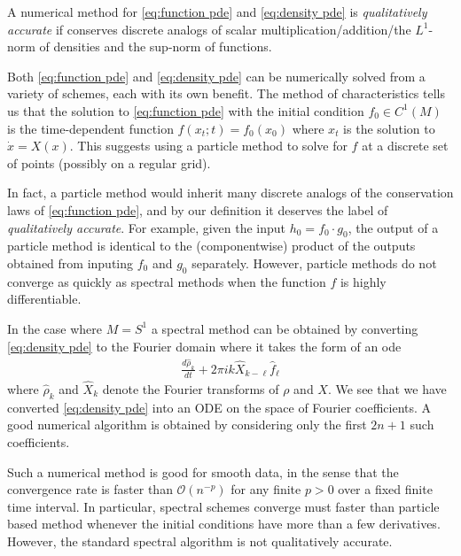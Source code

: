 \documentclass[final,leqno]{siamltex1213}
\begin{document}
\begin{definition}
	    A numerical method for \eqref{eq:function pde} and \eqref{eq:density pde} is \emph{qualitatively accurate} if conserves discrete analogs of scalar multiplication/addition/the $L^{1}$-norm of densities and the sup-norm of functions.
\end{definition}

Both \eqref{eq:function pde} and \eqref{eq:density pde} can be numerically solved from a variety of schemes, each with its own benefit.
The method of characteristics tells us that
the solution to \eqref{eq:function pde} with the initial condition $f_{0} \in C^{1}(M)$ is the time-dependent function $f( x_{t} ;t) = f_{0}( x_{0} )$ where $x_{t}$ is the solution to $\dot{x} = X(x)$.
This suggests using a particle method to solve for $f$ at a discrete set of points (possibly on a regular grid).
 
In fact, a particle method would inherit many discrete analogs of the conservation laws of \eqref{eq:function pde},
and by our definition it deserves the label of \emph{qualitatively accurate}.
For example, given the input $h_{0} = f_{0} \cdot g_{0}$, the output of a particle method is identical to the (componentwise) product of the outputs obtained from inputing $f_{0}$ and $g_{0}$ separately.
However, particle methods do not converge as quickly as spectral methods when the function $f$ is highly differentiable.

In the case where $M=S^{1}$ a spectral method can be obtained by converting \eqref{eq:density pde} to the Fourier domain where it takes the form
of an ode
\begin{align}
	\frac{d \hat{\rho}_{k}}{dt} + 2\pi i k  \widehat{X}_{k-\ell} \hat{f}_{\ell} \label{eq:standard spectral}
\end{align}
where $\hat{\rho}_{k}$ and $\widehat{X}_{k}$ denote the Fourier transforms of $\rho$ and $X$.
We see that we have converted \eqref{eq:density pde} into an ODE on the space of Fourier coefficients.
A good numerical algorithm is obtained by considering only the first $2n+1$ such coefficients.

Such a numerical method is good for smooth data, in the sense that the convergence rate is faster than $\mathcal{O}(n^{-p})$ for any finite $p > 0$ over a fixed finite time interval.
In particular, spectral schemes converge must faster than particle based method whenever the initial conditions have more than a few derivatives.
However, the standard spectral algorithm is not qualitatively accurate.
\end{document}
